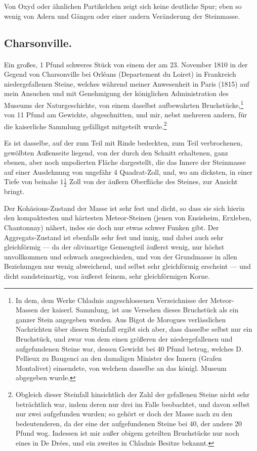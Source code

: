 \documentclass[a4paper, 11pt, oneside, german]{article}
\begin{document}
Von Oxyd oder ähnlichen Partikelchen zeigt sich keine deutliche Spur; eben so wenig von Adern und Gängen oder einer andern Veränderung der Steinmasse.

\subsection{Charsonville.}
\paragraph{}
Ein großes, 1 Pfund schweres Stück von einem der am 23. November 1810 in der Gegend von Charsonville bei Orléans (Departement du Loiret) in Frankreich niedergefallenen Steine, welches während meiner Anwesenheit in Paris (1815) auf mein Ansuchen und mit Genehmigung der königlichen Administration des Museums der Naturgeschichte, von einem daselbst aufbewahrten Bruchstücke,\footnote{In dem, dem Werke Chladnis angeschlossenen Verzeichnisse der Meteor-Massen der kaiserl. Sammlung, ist aus Versehen dieses Bruchstück als ein ganzer Stein angegeben worden. Aus Bigot de Morogues verlässlichen Nachrichten über diesen Steinfall ergibt sich aber, dass dasselbe selbst nur ein Bruchstück, und zwar von dem einen größeren der niedergefallenen und aufgefundenen Steine war, dessen Gewicht bei 40 Pfund betrug, welches D. Pellieux zu Baugenci an den damaligen Minister des Innern (Grafen Montalivet) einsendete, von welchem dasselbe an das königl. Museum abgegeben wurde.} von 11 Pfund am Gewichte, abgeschnitten, und mir, nebst mehreren andern, für die kaiserliche Sammlung gefälligst mitgeteilt wurde.\footnote{Obgleich dieser Steinfall hinsichtlich der Zahl der gefallenen Steine nicht sehr beträchtlich war, indem deren nur drei im Falle beobachtet, und davon selbst nur zwei aufgefunden wurden; so gehört er doch der Masse nach zu den bedeutenderen, da der eine der aufgefundenen Steine bei 40, der andere 20 Pfund wog. Indessen ist mir außer obigem geteilten Bruchstücke nur noch eines in De Drées, und ein zweites in Chladnis Besitze bekannt.}

Es ist dasselbe, auf der zum Teil mit Rinde bedeckten, zum Teil verbrochenen, gewölbten Außenseite liegend, von der durch den Schnitt erhaltenen, ganz ebenen, aber noch unpolierten Fläche dargestellt, die das Innere der Steinmasse auf einer Ausdehnung von ungefähr 4 Quadrat-Zoll, und, wo am dicksten, in einer Tiefe von beinahe $1\frac{1}{2}$ Zoll von der äußern Oberfläche des Steines, zur Ansicht bringt.

Der Kohäsions-Zustand der Masse ist sehr fest und dicht, so dass sie sich hierin den kompaktesten und härtesten Meteor-Steinen (jenen von Ensisheim, Erxleben, Chantonnay) nähert, indes sie doch nur etwas schwer Funken gibt. Der Aggregats-Zustand ist ebenfalls sehr fest und innig, und dabei auch sehr gleichförmig --- da der olivinartige Gemengteil äußerst wenig, nur höchst unvollkommen und schwach ausgeschieden, und von der Grundmasse in allen Beziehungen nur wenig abweichend, und selbst sehr gleichförmig erscheint --- und dicht sandsteinartig, von äußerst feinem, sehr gleichförmigen Korne.
\end{document}
